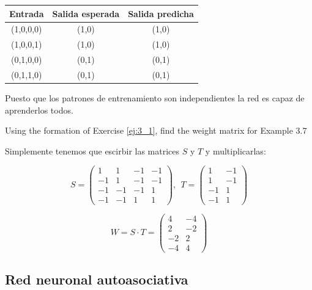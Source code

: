 \begin{problem}[6]
\spart

\begin{center}
\begin{tabular}{|c|c|c|}
\hline
\textbf{Entrada } & \textbf{Salida esperada} & \textbf{Salida predicha} \\
\hline
(1,0,0,0) & (1,0) & (1,0) \\
(1,0,0,1) & (1,0) & (1,0) \\
(0,1,0,0) & (0,1) & (0,1) \\
(0,1,1,0) & (0,1) & (0,1) \\
\hline
\end{tabular}
\end{center}

Puesto que los patrones de entrenamiento son independientes la red es capaz de aprenderlos todos.
\end{problem}

\begin{problem}[7]
Using the formation of Exercise \ref{ej:3_1}, find the weight matrix for Example 3.7
\solution


Simplemente tenemos que escirbir las matrices $S$ y $T$ y multiplicarlas:

\[S = \left( \begin{array}{cccc}
1  & 1  & -1 & -1 \\
-1 & 1  & -1 & -1 \\
-1 & -1 & -1 & 1 \\
-1 & -1 & 1  & 1
\end{array}\right), \ \ T = \left( \begin{array}{cc}
1  & -1 \\
1  & -1 \\
-1 & 1 \\
-1 & 1
\end{array}\right)\]

\[W = S\cdot T = \left( \begin{array}{cc}
4 & -4 \\
2 & -2 \\
-2 & 2 \\
-4 & 4
\end{array}\right)\]

\end{problem}

\subsection{Red neuronal autoasociativa}


